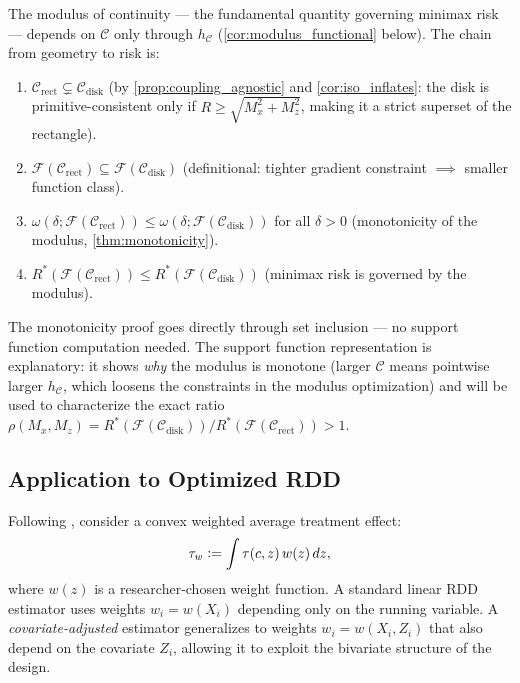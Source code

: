 The modulus of continuity --- the fundamental quantity governing minimax risk --- depends on $\mathcal{C}$ only through $h_{\mathcal{C}}$ (\cref{cor:modulus_functional} below).
The chain from geometry to risk is:
\begin{enumerate}
	\item $\mathcal{C}_{\mathrm{rect}} \subsetneq \mathcal{C}_{\mathrm{disk}}$ (by \cref{prop:coupling_agnostic} and \cref{cor:iso_inflates}: the disk is primitive-consistent only if $R \geq \sqrt{M_x^2 + M_z^2}$, making it a strict superset of the rectangle).
	\item $\mathcal{F}(\mathcal{C}_{\mathrm{rect}}) \subseteq \mathcal{F}(\mathcal{C}_{\mathrm{disk}})$ (definitional: tighter gradient constraint $\implies$ smaller function class).
	\item $\omega(\delta; \mathcal{F}(\mathcal{C}_{\mathrm{rect}})) \leq \omega(\delta; \mathcal{F}(\mathcal{C}_{\mathrm{disk}}))$ for all $\delta > 0$ (monotonicity of the modulus, \cref{thm:monotonicity}).
	\item $R^*(\mathcal{F}(\mathcal{C}_{\mathrm{rect}})) \leq R^*(\mathcal{F}(\mathcal{C}_{\mathrm{disk}}))$ (minimax risk is governed by the modulus).
\end{enumerate}
The monotonicity proof goes directly through set inclusion --- no support function computation needed.
The support function representation is explanatory: it shows \emph{why} the modulus is monotone (larger $\mathcal{C}$ means pointwise larger $h_{\mathcal{C}}$, which loosens the constraints in the modulus optimization) and will be used to characterize the exact ratio $\rho(M_x, M_z) = R^*(\mathcal{F}(\mathcal{C}_{\mathrm{disk}})) / R^*(\mathcal{F}(\mathcal{C}_{\mathrm{rect}})) > 1$.


\subsection{Application to Optimized RDD}\label{sec:argument:rdd}

Following \textcite{imbens_optimized_2019}, consider a convex weighted average treatment effect:
\begin{equation*}
	\tau_w \vcentcolon= \int \tau(c, z)\, w(z)\, dz,
\end{equation*}
where $w(z)$ is a researcher-chosen weight function.
A standard linear RDD estimator uses weights $w_i = w(X_i)$ depending only on the running variable.
A \emph{covariate-adjusted} estimator generalizes to weights $w_i = w(X_i, Z_i)$ that also depend on the covariate $Z_i$, allowing it to exploit the bivariate structure of the design.

